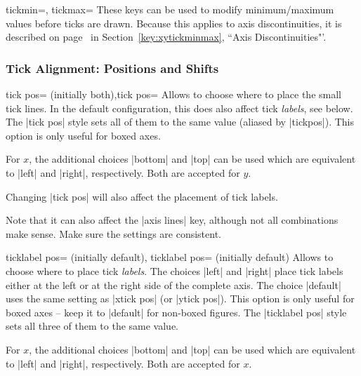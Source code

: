 \begin{pgfplotsxykeylist}{\x tickmin=, \x tickmax=}
	These keys can be used to modify minimum/maximum values before ticks are drawn. Because this applies to axis discontinuities, it is described on page~\pageref{key:xytickminmax} in Section~\ref{key:xytickminmax}, ``Axis Discontinuities"'.
\end{pgfplotsxykeylist}

\subsubsection{Tick Alignment: Positions and Shifts}

\begin{pgfplotsxykeylist}{\x tick pos= (initially both),tick pos=}
Allows to choose where to place the small tick lines. In the default configuration, this does also affect tick \emph{labels}, see below. The |tick pos| style sets all of them to the same value (aliased by |tickpos|). This option is only useful for boxed axes.

For $x$, the additional choices |bottom| and |top| can be used which are equivalent to |left| and |right|, respectively. Both are accepted for $y$.

Changing |tick pos| will also affect the placement of tick labels. 

Note that it can also affect the |axis lines| key, although not all combinations make sense. Make sure the settings are consistent.
\end{pgfplotsxykeylist}

\begin{pgfplotsxykeylist}{%
	\x ticklabel pos= (initially default),
	   ticklabel pos= (initially default)}
Allows to choose where to place tick \emph{labels}. The choices |left| and |right| place tick labels either at the left or at the right side of the complete axis. The choice |default| uses the same setting as |xtick pos| (or |ytick pos|). This option is only useful for boxed axes -- keep it to |default| for non-boxed figures. The |ticklabel pos| style sets all three of them to the same value.

For $x$, the additional choices |bottom| and |top| can be used which are equivalent to |left| and |right|, respectively. Both are accepted for $x$.
\end{pgfplotsxykeylist}

